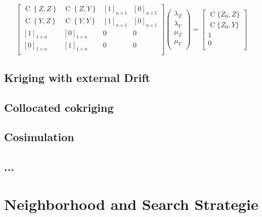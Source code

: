 \documentclass[twocolumn]{article}
\numberwithin{equation}{section}
\begin{document}
\[
		\begin{bmatrix}
       		\operatorname{C}\left\{Z,Z\right\} 	& \operatorname{C}\left\{Z,Y\right\} 	& [1]_{n\times 1}	& [0]_{n\times 1} 	\\
       		\operatorname{C}\left\{Y,Z\right\}  	& \operatorname{C}\left\{Y,Y\right\}		& [1]_{n\times 1}	& [0]_{n\times 1} 	\\
       		[1]_{1\times n}						& [0]_{1\times n}						& 0		& 0	\\
       		[0]_{1\times n}						& [1]_{1\times n}						& 0		& 0	\\
     	\end{bmatrix}
     	\begin{pmatrix}
       		\lambda_{Z} 	\\
       		\lambda_{Y}	\\
       		\mu_{Z} \\ 
       		\mu_{Y} \\
     	\end{pmatrix}
     	=
     	\begin{bmatrix}
       		\operatorname{C}\{{Z_0,Z}\} 	\\
       		\operatorname{C}\{{Z_0,Y}\}	\\
       		1 	\\
       		0\\
     	\end{bmatrix}
\] 


\subsection{Kriging with external Drift}

\subsection{Collocated cokriging}

\subsection{Cosimulation}

\subsection{...}



\section{Neighborhood and Search Strategie}
\end{document}
